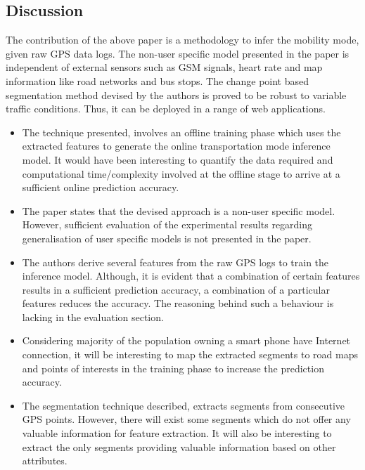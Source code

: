 \subsection*{Discussion}

The contribution of the above paper is a methodology to infer the mobility mode, given raw GPS
data logs. The non-user specific model presented in the paper is independent of external sensors
such as GSM signals, heart rate and map information like road networks and bus stops. The change
point based segmentation method devised by the authors is proved to be robust to variable traffic
conditions. Thus, it can be deployed in a range of web applications.

\begin{itemize}

\item The technique presented, involves an offline training phase which uses the extracted features
to generate the online transportation mode inference model. It would have been interesting to quantify
the data required and computational time/complexity involved at the offline stage to arrive at a 
sufficient online prediction accuracy.

\item The paper states that the devised approach is a non-user specific model. However, sufficient
evaluation of the experimental results regarding generalisation of user specific models is not presented
in the paper.

\item The authors derive several features from the raw GPS logs to train the inference model. Although,
it is evident that a combination of certain features results in a sufficient prediction accuracy, a
combination of a particular features reduces the accuracy. The reasoning behind such a behaviour is
lacking in the evaluation section.

\item Considering majority of the population owning a smart phone have Internet connection, it will be
interesting to map the extracted segments to road maps and points of interests in the training phase
to increase the prediction accuracy.

\item The segmentation technique described, extracts segments from consecutive GPS points. However, there
will exist some segments which do not offer any valuable information for feature extraction. It will
also be interesting to extract the only segments providing valuable information based on other
 attributes.
\end{itemize}
